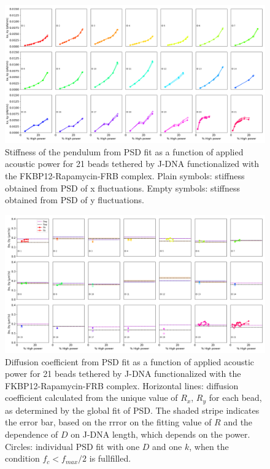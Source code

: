 \documentclass{biophys-new}
\begin{document}
\begin{figure}
	\centering
	\centerline {\includegraphics[width=1\linewidth]{Figures/Power_Stiffness_Ter_Rapa.png}}
	\caption{Stiffness of the pendulum from PSD fit as a function of applied acoustic power for 21 beads tethered by J-DNA functionalized with the FKBP12-Rapamycin-FRB complex. Plain symbols: stiffness obtained from PSD of x fluctuations. Empty symbols: stiffness obtained from PSD of y fluctuations.}
	\label{fig:PowerStiffness}	
\end{figure}

\begin{figure}
	\centering
	\centerline {\includegraphics[width=1\linewidth]{Figures/Power_Friction_Bis_Rapa.png}}
	\caption{%
	Diffusion coefficient from PSD fit as a function of applied acoustic power for 21 beads tethered by J-DNA functionalized with the FKBP12-Rapamycin-FRB complex. Horizontal lines: diffusion coefficient calculated from the unique value of $R_x$, $R_y$ for each bead, as determined by the global fit of PSD. The shaded stripe indicates the error bar, based on the rrror on the fitting value of $R$ and the dependence of $D$ on J-DNA length, which depends on the power. Circles: individual PSD fit with one $D$ and one $k$, when the condition $f_c < f_{max}/2$ is fullfilled.}
	\label{fig:PowerDiffusion}
\end{figure}
\end{document}
